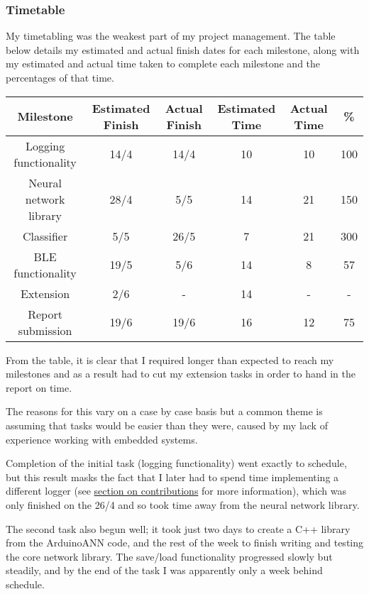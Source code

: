 \documentclass[a4paper]{article}
\begin{document}
\subsubsection{Timetable}
\label{subsubsec:ev_pm_timetable}

My timetabling was the weakest part of my project management. The table below details my estimated and actual finish dates for each milestone, along with my estimated and actual time taken to complete each milestone and the percentages of that time.

\begin{center}
  \begin{tabular}{|c|c|c|c|c|c|}
      \hline
      Milestone & Estimated Finish & Actual Finish & Estimated Time & Actual Time & \% \\
      \hline
      Logging functionality & 14/4 & 14/4 & 10 & 10 & 100 \\
      \hline
      Neural network library & 28/4 & 5/5 & 14 & 21 & 150 \\
      \hline
      Classifier & 5/5 & 26/5 & 7 & 21 & 300 \\
      \hline
      BLE functionality & 19/5 & 5/6 & 14 & 8 & 57\\
      \hline
      Extension & 2/6 & - & 14 & - & - \\
      \hline
      Report submission & 19/6 & 19/6 & 16 & 12 & 75\\
      \hline
      \end{tabular}
\end{center}

From the table, it is clear that I required longer than expected to reach my milestones and as a result had to cut my extension tasks in order to hand in the report on time.

The reasons for this vary on a case by case basis but a common theme is assuming that tasks would be easier than they were, caused by my lack of experience working with embedded systems.

Completion of the initial task (logging functionality) went exactly to schedule, but this result masks the fact that I later had to spend time implementing a different logger (see \hyperref[subsubsec:ev_cl_training]{section on contributions} for more information), which was only finished on the 26/4 and so took time away from the neural network library.

The second task also begun well; it took just two days to create a C++ library from the ArduinoANN code, and the rest of the week to finish writing and testing the core network library. The save/load functionality progressed slowly but steadily, and by the end of the task I was apparently only a week behind schedule.
\end{document}
